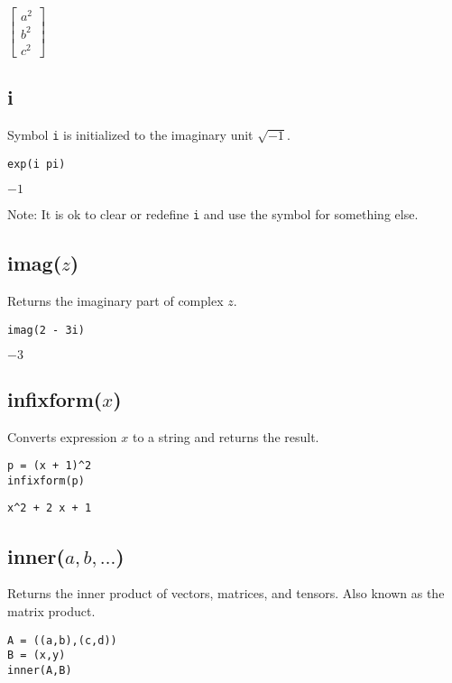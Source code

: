 \noindent
$\displaystyle
\begin{bmatrix}
a^2
\\[1ex]
b^2
\\[1ex]
c^2
\end{bmatrix}
$

\subsection*{i}

Symbol {\tt i} is initialized to the imaginary unit $\sqrt{-1}$.

{\color{blue}
\begin{verbatim}
exp(i pi)
\end{verbatim}
}

\noindent
$-1$

\bigskip
\noindent
Note: It is ok to clear or redefine {\tt i} and use the symbol for something else.

\subsection*{imag($z$)}

Returns the imaginary part of complex $z$.

{\color{blue}
\begin{verbatim}
imag(2 - 3i)
\end{verbatim}
}

\noindent
$-3$

\subsection*{infixform($x$)}

Converts expression $x$ to a string and returns the result.

{\color{blue}
\begin{verbatim}
p = (x + 1)^2
infixform(p)
\end{verbatim}
}

\noindent
\verb$x^2 + 2 x + 1$

\subsection*{inner($a,b,\ldots$)}

Returns the inner product of vectors, matrices, and tensors.
Also known as the matrix product.

{\color{blue}
\begin{verbatim}
A = ((a,b),(c,d))
B = (x,y)
inner(A,B)
\end{verbatim}
}

